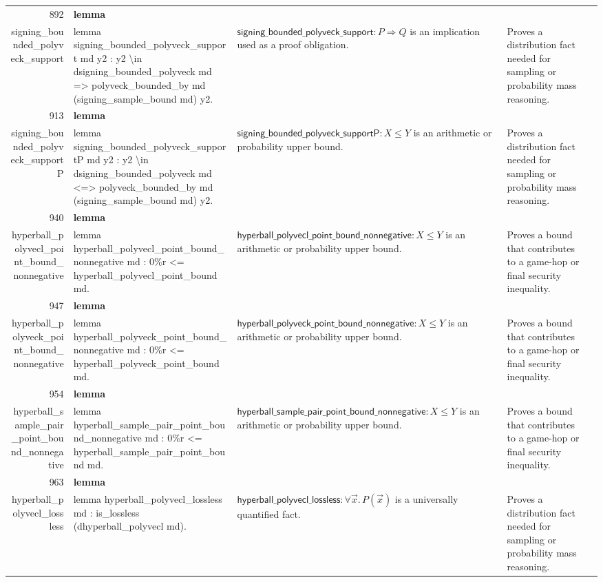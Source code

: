 \documentclass[10pt]{article}
\newcommand{\ec}[1]{\begingroup\ttfamily\scriptsize #1\endgroup}
\begin{document}
\begin{longtable}{r L{0.17\textwidth} L{0.26\textwidth} L{0.27\textwidth} L{0.20\textwidth}}
892 & \textbf{lemma}\\\ec{signing\_bounded\_polyveck\_support} & \ec{lemma signing\_bounded\_polyveck\_support md y2 : y2 \textbackslash{}in dsigning\_bounded\_polyveck md => polyveck\_bounded\_by md (signing\_sample\_bound md) y2.} & \(\mathsf{signing\_bounded\_polyveck\_support} : P \Rightarrow Q\) is an implication used as a proof obligation. & Proves a distribution fact needed for sampling or probability mass reasoning. \\
913 & \textbf{lemma}\\\ec{signing\_bounded\_polyveck\_supportP} & \ec{lemma signing\_bounded\_polyveck\_supportP md y2 : y2 \textbackslash{}in dsigning\_bounded\_polyveck md <=> polyveck\_bounded\_by md (signing\_sample\_bound md) y2.} & \(\mathsf{signing\_bounded\_polyveck\_supportP} : X \le Y\) is an arithmetic or probability upper bound. & Proves a distribution fact needed for sampling or probability mass reasoning. \\
940 & \textbf{lemma}\\\ec{hyperball\_polyvecl\_point\_bound\_nonnegative} & \ec{lemma hyperball\_polyvecl\_point\_bound\_nonnegative md : 0\%r <= hyperball\_polyvecl\_point\_bound md.} & \(\mathsf{hyperball\_polyvecl\_point\_bound\_nonnegative} : X \le Y\) is an arithmetic or probability upper bound. & Proves a bound that contributes to a game-hop or final security inequality. \\
947 & \textbf{lemma}\\\ec{hyperball\_polyveck\_point\_bound\_nonnegative} & \ec{lemma hyperball\_polyveck\_point\_bound\_nonnegative md : 0\%r <= hyperball\_polyveck\_point\_bound md.} & \(\mathsf{hyperball\_polyveck\_point\_bound\_nonnegative} : X \le Y\) is an arithmetic or probability upper bound. & Proves a bound that contributes to a game-hop or final security inequality. \\
954 & \textbf{lemma}\\\ec{hyperball\_sample\_pair\_point\_bound\_nonnegative} & \ec{lemma hyperball\_sample\_pair\_point\_bound\_nonnegative md : 0\%r <= hyperball\_sample\_pair\_point\_bound md.} & \(\mathsf{hyperball\_sample\_pair\_point\_bound\_nonnegative} : X \le Y\) is an arithmetic or probability upper bound. & Proves a bound that contributes to a game-hop or final security inequality. \\
963 & \textbf{lemma}\\\ec{hyperball\_polyvecl\_lossless} & \ec{lemma hyperball\_polyvecl\_lossless md : is\_lossless (dhyperball\_polyvecl md).} & \(\mathsf{hyperball\_polyvecl\_lossless} : \forall \vec{x}.\, P(\vec{x})\) is a universally quantified fact. & Proves a distribution fact needed for sampling or probability mass reasoning. \\

\end{longtable}
\end{document}
